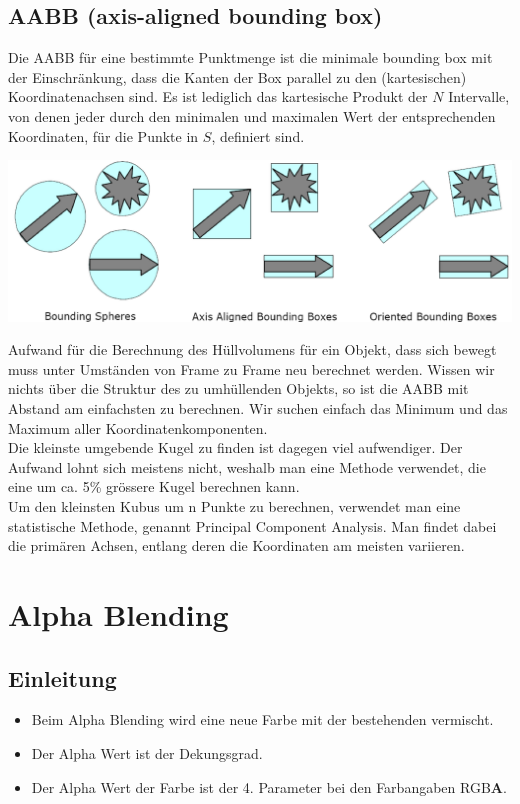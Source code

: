 \documentclass[10pt]{article}
\newcommand{\Bold}[1]{\textbf{#1}} %
\begin{document}
\subsection{AABB (axis-aligned bounding box)}
Die AABB für eine bestimmte Punktmenge ist die minimale bounding box mit der Einschränkung, dass die Kanten der Box parallel zu den (kartesischen) Koordinatenachsen sind. Es ist lediglich das kartesische Produkt der $N$ Intervalle, von denen jeder durch den minimalen und maximalen Wert der entsprechenden Koordinaten, für die Punkte in $S$, definiert sind.\\
\begin{center}
	\includegraphics[scale=0.3]{huellvolumen.png}
\end{center}
Aufwand für die Berechnung des Hüllvolumens für ein Objekt, dass sich bewegt muss unter Umständen von Frame zu Frame neu berechnet werden. Wissen wir nichts über die Struktur des zu umhüllenden Objekts, so ist die AABB mit Abstand am einfachsten zu berechnen. Wir suchen einfach das Minimum und das Maximum aller Koordinatenkomponenten.\\
Die kleinste umgebende Kugel zu finden ist dagegen viel aufwendiger. Der Aufwand lohnt sich meistens nicht, weshalb man eine Methode verwendet, die eine um ca. 5\% grössere Kugel berechnen kann.\\
Um den kleinsten Kubus um n Punkte zu berechnen, verwendet man eine statistische Methode, genannt Principal Component Analysis. Man findet dabei die primären Achsen, entlang deren die Koordinaten am meisten variieren.


\newpage
\section{Alpha Blending}
\subsection{Einleitung}
\begin{itemize}
	\item Beim Alpha Blending wird eine neue Farbe mit der bestehenden vermischt.
	\item Der Alpha Wert ist der Dekungsgrad.
	\item Der Alpha Wert der Farbe ist der 4. Parameter bei den Farbangaben RGB\Bold{A}.
\end{itemize}
\end{document}
